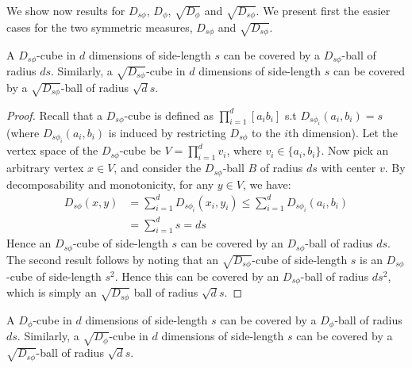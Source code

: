 \documentclass[11pt]{myclass}
\newcommand{\breg}{\ensuremath{D_\phi}}
\newcommand{\sbreg}{\ensuremath{D_{s\phi}}}
\begin{document}
We show now results for $\sbreg$,
$\breg$, $\sqrt{\breg}$ and $\sqrt{\sbreg}$. We present first the easier cases for the two symmetric measures, $\sbreg$ and
$\sqrt{\sbreg}$. 

\begin{lemma}\label{scube}
A $\sbreg$-cube in $d$ dimensions of side-length $s$ can be covered by a $\sbreg$-ball of radius $ds$. 
Similarly, a $\sqrt{\sbreg}$-cube in $d$ dimensions of side-length $s$ can be covered by a $\sqrt{\sbreg}$-ball
of radius $\sqrt{d} s$. 
\end{lemma}

\begin{proof}
Recall that a $\sbreg$-cube is defined as $\prod_{i=1}^d [a_i b_i]$ s.t $D_{s \phi_i}(a_i,b_i) = s$ (where $D_{s \phi_i}(a_i,b_i)$ is
induced by restricting $\sbreg$ to the $i$th dimension). Let the vertex space of the $\sbreg$-cube be $V = \prod_{i=1}^d v_i$, where $v_i \in \{a_i, b_i \}$. Now pick an arbitrary vertex $x \in V$, and consider
the $\sbreg$-ball $B$ of radius $ds$ with center $v$. By decomposability and monotonicity, for any $y \in V$, we have:
\begin{align*}
\sbreg(x,y) &= \sum_{i=1}^d D_{s \phi_i} (x_i,y_i) \leq \sum_{i=1}^d D_{s \phi_i} (a_i,b_i)\\
			 &= \sum_{i=1}^d s = ds			
\end{align*} 
Hence an $\sbreg$-cube of side-length $s$ can be covered by an $\sbreg$-ball of radius $ds$.  The second result follows
by noting that an $\sqrt{\sbreg}$-cube of side-length $s$ is an $\sbreg$-cube of side-length $s^2$. Hence this can be covered
by an $\sbreg$-ball of radius $d s^2$, which is simply an $\sqrt{\sbreg}$ ball of radius $\sqrt{d} s$.
\end{proof}


\begin{lemma}\label{acube}
A $\breg$-cube in $d$ dimensions of side-length $s$ can be covered by a $\breg$-ball of radius $ds$. 
Similarly, a $\sqrt{\breg}$-cube in $d$ dimensions of side-length $s$ can be covered by a $\sqrt{\sbreg}$-ball
of radius $\sqrt{d} s$. 
\end{lemma}
\end{document}
